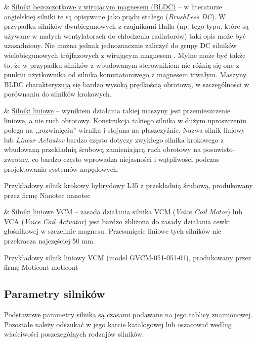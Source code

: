 \begin{easylist}
	& \underline{Silniki bezszczotkowe z wirującym magnesem (BLDC)} -- w literaturze angielskiej silniki te są opisywane jako prądu stałego ({\em BrushLess DC}). W przypadku silników dwubiegunowych z czujnikami Halla (np. tego typu, które są używane w małych wentylatorach do chłodzenia radiatorów) taki opis może być uzasadniony. Nie można jednak jednoznacznie zaliczyć do grupy DC silników wielobiegunowych trójfazowych z wirującym magnesem \cite{przepiorkowski}. Mylne może być także to, że w przypadku silników z wbudowanym sterownikiem nie różnią się one z punktu użytkownika od silnika komutatorowego z magnesem trwałym. Maszyny BLDC charakteryzują się bardzo wysoką prędkością obrotową, w szczególności w porównaniu do silników krokowych.	
	
	& \underline{Silniki liniowe} -- wynikiem działania takiej maszyny jest przemieszczenie liniowe, a nie ruch obrotowy. Konstrukcja takiego silnika w dużym uproszczeniu polega na ,,rozwinięciu'' wirnika i stojana na płaszczyźnie. Nazwa silnik liniowy lub {\em Linear Actuator} bardzo często dotyczy zwykłego silnika krokowego z wbudowaną przekładnią śrubową zamieniającą ruch obrotowy na posuwisto--zwrotny, co bardzo często wprowadza niejasności i wątpliwości podczas projektowania systemów napędowych.
	
		{Przykładowy silnik krokowy hybrydowy L35 z przekładnią śrubową, produkowany przez firmę Nanotec}
		{nanotec}
	
	& \underline{Silniki liniowe VCM} -- zasada działania silnika VCM ({\em Voice Coil Motor}) lub VCA ({\em Voice Coil Actuator}) jest bardzo zbliżona do zasady działania cewki głośnikowej w szczelinie magnesu. Przesunięcie liniowe tych silników nie przekracza najczęściej 50 mm.		
	
\end{easylist} 

	{Przykładowy silnik liniowy VCM (model GVCM-051-051-01), produkowany przez firmę Moticont}
	{moticont}
	
\subsection{Parametry silników}

Podstawowe parametry silnika są czasami podawane na jego tablicy znamionowej. Pozostałe należy odszukać w jego karcie katalogowej lub oszacować według właściwości poszczególnych rodzajów silników.
\\

